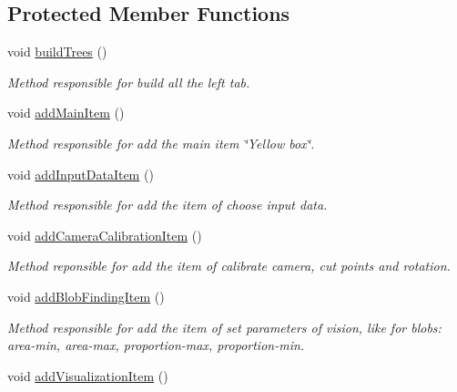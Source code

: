 \subsection*{Protected Member Functions}
\begin{DoxyCompactItemize}
\item 
void \hyperlink{classMainWindow_a904aeccdff7a61af31954793944ef364}{build\+Trees} ()
\begin{DoxyCompactList}\small\item\em Method responsible for build all the left tab. \end{DoxyCompactList}\item 
void \hyperlink{classMainWindow_a7f3e055a4f80071b7265cc32d10b1a29}{add\+Main\+Item} ()
\begin{DoxyCompactList}\small\item\em Method responsible for add the main item \char`\"{}\+Yellow box\char`\"{}. \end{DoxyCompactList}\item 
void \hyperlink{classMainWindow_aa2cc5fc73f649129465c371368185189}{add\+Input\+Data\+Item} ()\hypertarget{classMainWindow_aa2cc5fc73f649129465c371368185189}{}\label{classMainWindow_aa2cc5fc73f649129465c371368185189}

\begin{DoxyCompactList}\small\item\em Method responsible for add the item of choose input data. \end{DoxyCompactList}\item 
void \hyperlink{classMainWindow_ae887769c9a6614f6827afdb74ab9cd12}{add\+Camera\+Calibration\+Item} ()\hypertarget{classMainWindow_ae887769c9a6614f6827afdb74ab9cd12}{}\label{classMainWindow_ae887769c9a6614f6827afdb74ab9cd12}

\begin{DoxyCompactList}\small\item\em Method reponsible for add the item of calibrate camera, cut points and rotation. \end{DoxyCompactList}\item 
void \hyperlink{classMainWindow_a659cf521c8e7053eaba4971293050883}{add\+Blob\+Finding\+Item} ()\hypertarget{classMainWindow_a659cf521c8e7053eaba4971293050883}{}\label{classMainWindow_a659cf521c8e7053eaba4971293050883}

\begin{DoxyCompactList}\small\item\em Method responsible for add the item of set parameters of vision, like for blobs\+: area-\/min, area-\/max, proportion-\/max, proportion-\/min. \end{DoxyCompactList}\item 
void \hyperlink{classMainWindow_aa30ad88d5b5acbf1cc9f70840d416e24}{add\+Visualization\+Item} ()\hypertarget{classMainWindow_aa30ad88d5b5acbf1cc9f70840d416e24}{}\label{classMainWindow_aa30ad88d5b5acbf1cc9f70840d416e24}


\end{DoxyCompactItemize}

